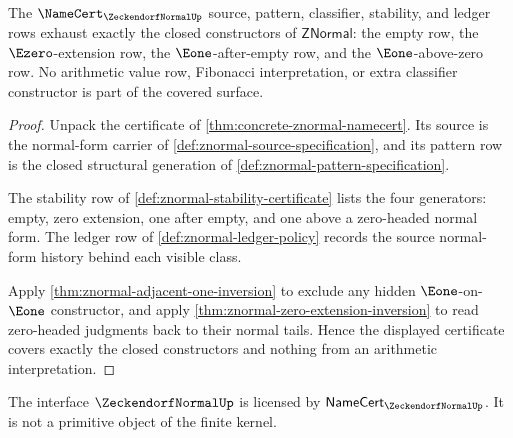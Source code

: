 \begin{theorem}
\label{thm:znormal-normal-form-coverage}
The $\NameCert_{\ZeckendorfNormalUp}$ source, pattern, classifier, stability, and ledger
rows exhaust exactly the closed constructors of $\mathsf{ZNormal}$: the empty
row, the $\Ezero$-extension row, the $\Eone$-after-empty row, and the
$\Eone$-above-zero row. No arithmetic value row, Fibonacci interpretation, or
extra classifier constructor is part of the covered surface.
\end{theorem}
\begin{proof}
Unpack the certificate of \autoref{thm:concrete-znormal-namecert}. Its source is
the normal-form carrier of \autoref{def:znormal-source-specification}, and its
pattern row is the closed structural generation of
\autoref{def:znormal-pattern-specification}.

The stability row of \autoref{def:znormal-stability-certificate} lists the four
generators: empty, zero extension, one after empty, and one above a zero-headed
normal form. The ledger row of \autoref{def:znormal-ledger-policy} records the
source normal-form history behind each visible class.

Apply \autoref{thm:znormal-adjacent-one-inversion} to exclude any hidden
$\Eone$-on-$\Eone$ constructor, and apply
\autoref{thm:znormal-zero-extension-inversion} to read zero-headed judgments
back to their normal tails. Hence the displayed certificate covers exactly the
closed constructors and nothing from an arithmetic interpretation.
\end{proof}

\begin{corollary}
\label{cor:znormal-licensed-not-primitive}
The interface $\ZeckendorfNormalUp$ is licensed by $\mathsf{NameCert}_{\ZeckendorfNormalUp}$. It is not a primitive object of the finite kernel.
\end{corollary}

